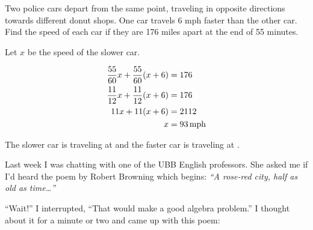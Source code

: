 \documentclass[letterpaper]{exam}
\begin{document}
\begin{questions}




    \question{}
      Two police cars depart from the same point, traveling in opposite directions towards different donut shops. One
      car travels 6 mph faster than the other car.  Find the speed of each car if they are 176 miles apart at the end of
      55 minutes.

      \begin{solution}
        Let $x$ be the speed of the slower car.

        \begin{align*}
          \frac{55}{60} x + \frac{55}{60}(x + 6) & = 176 \\
          \frac{11}{12} x + \frac{11}{12}(x + 6) & = 176 \\
          11x + 11(x + 6)                        & = 2112 \\
          x                                      & = \unit[93]{mph} \\
        \end{align*}

        The slower car is traveling at  and the faster car is traveling at .

      \end{solution}

    \ifprintanswers{}
    \else
      \newpage
    \fi

    \question{}
      Last week I was chatting with one of the UBB English professors.  She asked me if I'd heard the poem by Robert
      Browning which begins: {\em ``A rose-red city, half as old as time\ldots ''\/}

      ``Wait!'' I interrupted,  ``That would make a good algebra problem.''  I thought about it for a minute or two and
      came up with this poem:


\end{questions}
\end{document}
